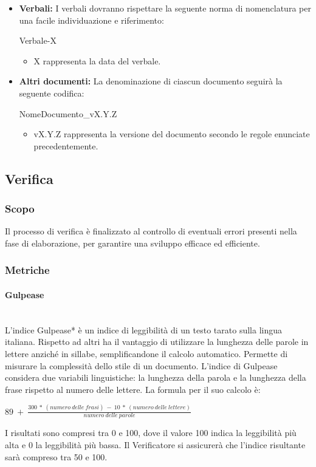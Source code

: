 \documentclass[11pt,a4paper]{article}
\begin{document}
\begin{itemize}
\item \textbf{Verbali:} I verbali dovranno rispettare la seguente norma di nomenclatura per una facile individuazione e riferimento:
\begin{center}
	Verbale-X
\end{center}

\begin{itemize}
	\item X rappresenta la data del verbale.
\end{itemize}

\item \textbf{Altri documenti:} La denominazione di ciascun documento seguirà la seguente codifica:
\begin{center}
	NomeDocumento\_vX.Y.Z
\end{center}

\begin{itemize}
	\item vX.Y.Z rappresenta la versione del documento secondo le regole enunciate precedentemente.
\end{itemize}

\end{itemize}

\newpage

\subsection{Verifica}

\subsubsection{Scopo}
Il processo di verifica è finalizzato al controllo di eventuali errori presenti nella fase di elaborazione, per garantire una sviluppo efficace ed efficiente.



\subsubsection{Metriche}
\paragraph{Gulpease}
\noindent \\ 
L'indice Gulpease* è un indice di leggibilità di un testo tarato sulla lingua italiana. Rispetto ad altri ha il vantaggio di utilizzare la lunghezza delle parole in lettere anziché in sillabe, semplificandone il calcolo automatico. Permette di misurare la complessità dello stile di un documento. L'indice di Gulpease considera due variabili linguistiche: la lunghezza della parola e la lunghezza della frase rispetto al numero delle lettere. La formula per il suo calcolo è:
\begin{center}
	$89\ +\ \frac{300\ *\ (numero\ delle\ frasi)\ -\ 10\ *\ (numero\ delle\ lettere)}{numero\ delle\ parole}$
\end{center}
I risultati sono compresi tra 0 e 100, dove il valore 100 indica la leggibilità più alta e 0 la leggibilità più bassa. Il Verificatore si assicurerà che l'indice risultante sarà compreso tra 50 e 100.
\end{document}
